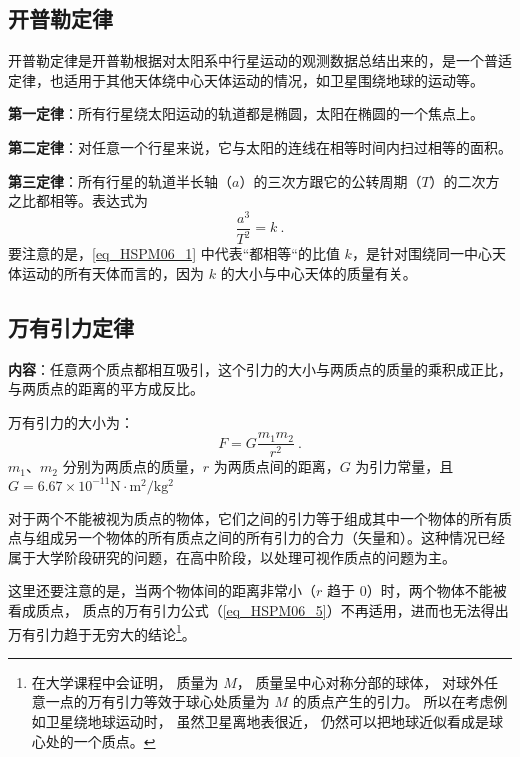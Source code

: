 

\subsection{开普勒定律}

开普勒定律是开普勒根据对太阳系中行星运动的观测数据总结出来的，是一个普适定律，也适用于其他天体绕中心天体运动的情况，如卫星围绕地球的运动等。

\textbf{第一定律}：所有行星绕太阳运动的轨道都是椭圆，太阳在椭圆的一个焦点上。

\textbf{第二定律}：对任意一个行星来说，它与太阳的连线在相等时间内扫过相等的面积。

\textbf{第三定律}：所有行星的轨道半长轴（$a$）的三次方跟它的公转周期（$T$）的二次方之比都相等。表达式为
\begin{equation}\label{eq_HSPM06_1}
\frac{a^3}{T^2}=k~.
\end{equation}
要注意的是，\autoref{eq_HSPM06_1} 中代表“都相等“的比值 $k$，是针对围绕同一中心天体运动的所有天体而言的，因为 $k$ 的大小与中心天体的质量有关。

\subsection{万有引力定律}\label{sub_HSPM06_1}

\textbf{内容}：任意两个质点都相互吸引，这个引力的大小与两质点的质量的乘积成正比，与两质点的距离的平方成反比。

万有引力的大小为：
\begin{equation}\label{eq_HSPM06_5}
F=G\frac{m_1m_2}{r^2}~.
\end{equation}
$m_1$、$m_2$ 分别为两质点的质量，$r$ 为两质点间的距离，$G$ 为引力常量，且 $G=6.67\times 10^{-11}\mathrm{N\cdot m^2/kg^2}$

对于两个不能被视为质点的物体，它们之间的引力等于组成其中一个物体的所有质点与组成另一个物体的所有质点之间的所有引力的合力（矢量和）。这种情况已经属于大学阶段研究的问题，在高中阶段，以处理可视作质点的问题为主。

这里还要注意的是，当两个物体间的距离非常小（$r$ 趋于 $0$）时，两个物体不能被看成质点， 质点的万有引力公式（\autoref{eq_HSPM06_5}）不再适用，进而也无法得出万有引力趋于无穷大的结论\footnote{在大学课程中会证明， 质量为 $M$， 质量呈中心对称分部的球体， 对球外任意一点的万有引力等效于球心处质量为 $M$ 的质点产生的引力。 所以在考虑例如卫星绕地球运动时， 虽然卫星离地表很近， 仍然可以把地球近似看成是球心处的一个质点。}。

